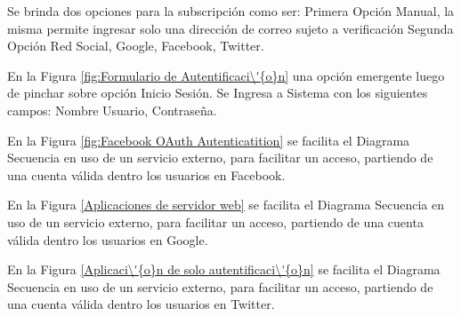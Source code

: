 Se brinda dos opciones para la subscripci\'{o}n como ser: Primera Opci\'{o}n
Manual, la misma permite ingresar solo una direcci\'{o}n de correo sujeto a verificaci\'{o}n
Segunda Opci\'{o}n Red Social, Google, Facebook, Twitter. 

\begin{minipage}{1.0\textwidth}
	\centering
	\label{fig:Ventana emergente subscripci\'{o}n}
\end{minipage}

En la Figura \ref{fig:Formulario de Autentificaci\'{o}n} una opci\'{o}n emergente
luego de pinchar sobre opci\'{o}n Inicio Sesi\'{o}n. Se Ingresa a Sistema con
los siguientes campos: Nombre Usuario, Contrase\~{n}a.

\begin{minipage}{1.0\textwidth}
	\centering
	\label{fig:Formulario de Autentificaci\'{o}n}
\end{minipage}

En la Figura \ref{fig:Facebook OAuth Autenticatition} se facilita el Diagrama 
Secuencia en uso de un servicio externo, para facilitar un acceso, partiendo
de una cuenta v\'{a}lida dentro los usuarios en Facebook.

\begin{minipage}{1.0\textwidth}
	\centering
	\label{fig:Facebook OAuth Autenticatition}
\end{minipage}

En la Figura \ref{Aplicaciones de servidor web} se facilita el Diagrama Secuencia
en uso de un servicio externo, para facilitar un acceso, partiendo de una cuenta
v\'{a}lida dentro los usuarios en Google.

\begin{minipage}{1.0\textwidth}
	\centering
	\label{Aplicaciones de servidor web}
\end{minipage}

En la Figura \ref{Aplicaci\'{o}n de solo autentificaci\'{o}n} se facilita el 
Diagrama Secuencia en uso de un servicio externo, para facilitar un acceso,
partiendo de una cuenta v\'{a}lida dentro los usuarios en Twitter.

